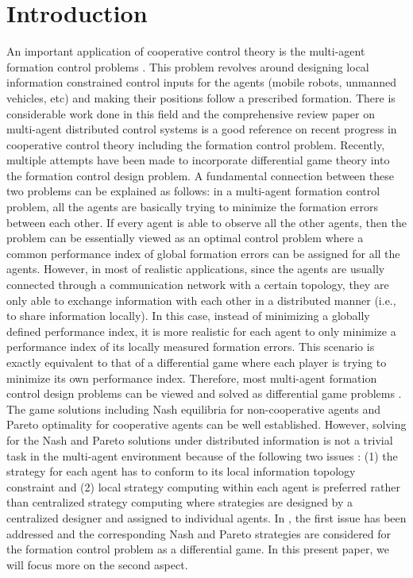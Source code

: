 \documentclass[12pt,draftcls,onecolumn]{IEEEtran}  %
\begin{document}
\newtheorem{Def}{Definition}
\newtheorem{Asu}{Assumption}
\newtheorem{thm}{Theorem}
\newtheorem{Pro}{Proposition}
\newtheorem{Alg}{Algorithm}
\newtheorem{Lem}{Lemma}
\newtheorem{Rmk}{Remark}
\newtheorem{Cor}{Corollary}

\section{Introduction}
An important application of cooperative control theory \cite{ren,Qu} is the multi-agent formation control problems \cite{Stipanovic2004,Keviczky2008,JiananWang2012}. This problem revolves around designing  local information constrained control inputs for the agents (mobile robots, unmanned vehicles, etc) and making their positions follow a prescribed formation. There  is considerable work  done in this field and the comprehensive review paper \cite{Cao2013} on multi-agent distributed control systems is a good reference on recent progress in cooperative control theory including the formation control problem. Recently, multiple attempts \cite{anderson1998formation,DongbingGu2008,SemsarKazerooni20092205} have been made to incorporate differential  game theory \cite{Isaacs,Basar} into the formation control design problem. A fundamental connection between these two problems can be explained as follows: in a multi-agent formation control problem, all the agents are basically trying to minimize the formation errors between each other. If every agent is able to observe all the other agents, then the problem can be essentially viewed as an optimal control problem where a common performance index of global formation errors can be assigned for all the agents. However, in most of realistic applications, since the agents are usually connected through a communication network  with  a certain topology, they are only able to exchange information with each other in a distributed manner (i.e., to share information locally). In this case, instead of minimizing a globally defined performance index, it is  more realistic  for each agent to only minimize a performance index of its locally measured formation errors. This scenario is exactly equivalent to that of a differential game where each player is trying to minimize its own performance index. Therefore, most  multi-agent  formation control design  problems  can be viewed and solved as  differential game problems . The game solutions including  Nash equilibria for non-cooperative agents and Pareto optimality for cooperative agents can be well established. However, solving  for  the Nash and Pareto solutions under distributed information is not a trivial task in the multi-agent environment because of the following two  issues : (1) the strategy for each agent has to conform to its local information topology constraint and (2) local strategy computing within each agent is preferred rather than centralized strategy computing where strategies are designed by a centralized designer and assigned to individual agents.  In \cite{DongbingGu2008,SemsarKazerooni20092205}, the first  issue  has been addressed and the corresponding Nash and Pareto strategies are considered for the formation control problem as a differential game. In this present paper, we will focus more on the second aspect. 
\end{document}
